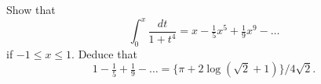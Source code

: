 Show that
\[
\int_{0}^{x} \frac{dt}{1 + t^{4}} = x - \tfrac{1}{5}x^{5} + \tfrac{1}{9}x^{9} - \dots
\]
if $-1 \leq x \leq 1$. Deduce that
\[
1 - \tfrac{1}{5} + \tfrac{1}{9} - \dots
  = \{\pi + 2\log(\sqrt{2} + 1)\}/4\sqrt{2}.
\]

